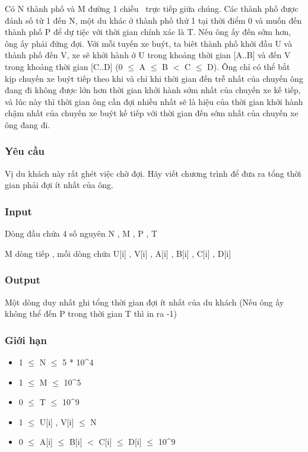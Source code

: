 

Có N thành phố và M đường 1 chiều  trực tiếp giữa chúng. Các thành phố được đánh số từ 1 đến N, một du khác ở thành phố thứ 1 tại thời điểm 0 và muốn đến thành phố P để dự tiệc với thời gian chính xác là T. Nếu ông ấy đến sớm hơn, ông ấy phải đứng đợi. Với mỗi tuyến xe buýt, ta biêt thành phố khởi đầu U và thành phố đến V, xe sẽ khởi hành ở U trong khoảng thời gian [A..B] và đến V trong khoảng thời gian [C..D] (0  $\le$  A  $\le$  B $<$ C  $\le$  D). Ông chỉ có thể bắt kịp chuyến xe buýt tiếp theo khi và chỉ khi thời gian đến trễ nhất của chuyến ông đang đi không được lớn hơn thời gian khởi hành sớm nhất của chuyến xe kế tiếp, và lúc này thì thời gian ông cần đợi nhiều nhất sẽ là hiệu của thời gian khởi hành chậm nhất của chuyến xe buýt kế tiếp với thời gian đến sớm nhất của chuyến xe ông đang đi.

\subsubsection{Yêu cầu}

Vị du khách này rất ghét việc chờ đợi. Hãy viết chương trình để đưa ra tổng thời gian phải đợi ít nhất của ông.

\subsubsection{Input}

Dòng đầu chứa 4 số nguyên N , M , P , T

M dòng tiếp , mỗi dòng chứa U[i] , V[i] , A[i] , B[i] , C[i] , D[i]

\subsubsection{Output}

Một dòng duy nhất ghi tổng thời gian đợi ít nhất của du khách (Nếu ông ấy không thể đến P trong thời gian T thì in ra -1)

\subsubsection{Giới hạn}
\begin{itemize}
	\item 1  $\le$  N  $\le$  5 * 10^4
	\item 1  $\le$  M  $\le$  10^5
	\item 0  $\le$  T  $\le$  10^9
	\item 1  $\le$  U[i] , V[i]  $\le$  N
	\item 0  $\le$  A[i]  $\le$  B[i] $<$ C[i]  $\le$  D[i]  $\le$  10^9
\end{itemize}

